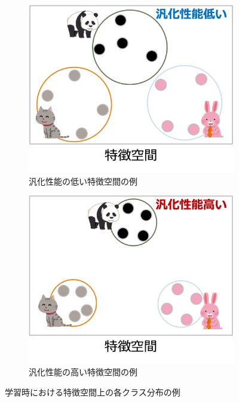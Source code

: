 \documentclass[a4paper,11pt,nomag]{jsreport}
\begin{document}
\begin{figure}[tbp]
  \centering
  \begin{subfigure}[b]{0.45\linewidth}
    \centering
    \includegraphics[height=0.9\linewidth, keepaspectratio]{image/bad_featurespace.png}
    \caption{汎化性能の低い特徴空間の例}
    \label{fig:bad_featurespace}
  \end{subfigure}
  \hfill
  \begin{subfigure}[b]{0.45\linewidth}
    \centering
    \includegraphics[height=0.9\linewidth, keepaspectratio]{image/good_featurespace.png}
    \caption{汎化性能の高い特徴空間の例}
    \label{fig:good_featurespace}
  \end{subfigure}
  \caption{学習時における特徴空間上の各クラス分布の例}
  \label{fig:feature_space}
\end{figure}
\end{document}
